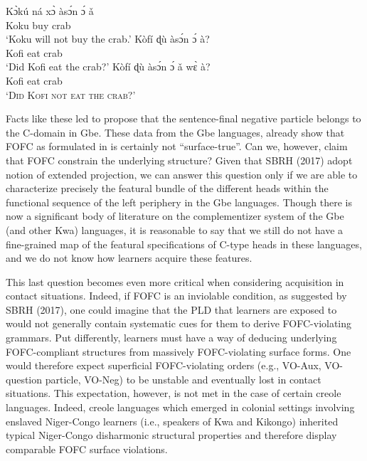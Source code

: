 \documentclass[output=paper]{langsci/langscibook}
\begin{document}
\ea\label{ex:aboh:14.3} 
    \ea\label{ex:aboh:14.3a}
        \gll    K\`ɔkú ná x\`ɔ às\'ɔn \'ɔ \v{a} \\
                Koku \Fut{} buy crab \Det{} \Neg{} \\
        \glt    \enquote*{Koku will not buy the crab.}
    \ex\label{ex:aboh:14.3b}
        \gll    Kòfí ɖù às\'ɔn \'ɔ à? \\
                Kofi eat crab \Det{} \glossQ{} \\
        \glt    \enquote*{Did Kofi eat the crab?}
    \ex\label{ex:aboh:14.3c}
        \gll    Kòfí ɖù às\'ɔn \'ɔ \v{a} w\`ɛ à? \\
                Kofi eat crab \Det{} \Neg{} \Foc{} \glossQ{}\\
        \glt    \enquote*{\textsc{Did Kofi not eat the crab?}}
    \z
\z

Facts like these led \citet{Aboh2010a} to propose that the sentence-final
negative particle belongs to the C-domain in Gbe. These data from the Gbe
languages, already show that \gls{FOFC} as formulated in  is certainly
not “surface-true”. Can we, however, claim that \gls{FOFC} constrain the underlying
structure? Given that SBRH (2017) adopt  notion of extended
projection, we can answer this question only if we are able to characterize
precisely the featural bundle of the different heads within the functional
sequence of the left periphery in the Gbe languages. Though there is now a
significant body of literature on the complementizer system of the Gbe (and
other Kwa) languages, it is reasonable to say that we still do not have a
fine-grained map of the featural specifications of C-type heads in these
languages, and we do not know how learners acquire these features.

This last question becomes even more critical when considering acquisition in
contact situations. Indeed, if \gls{FOFC} is an inviolable condition, as suggested by
SBRH (2017), one could imagine that the \gls{PLD} that learners are
exposed to would not generally contain systematic cues for them to derive
FOFC-violating grammars. Put differently, learners must have a way of deducing
underlying FOFC-compliant structures from massively FOFC-violating surface
forms. One would therefore expect superficial FOFC-violating orders (e.g.,
VO-Aux, VO-question particle, VO-Neg) to be unstable and eventually lost in
contact situations. This expectation, however, is not met in the case of
certain creole languages. Indeed, creole languages which emerged in colonial
settings involving enslaved Niger-Congo learners (i.e., speakers of Kwa and
Kikongo) inherited typical Niger-Congo disharmonic structural properties and
therefore display comparable \gls{FOFC} surface violations.
\end{document}
